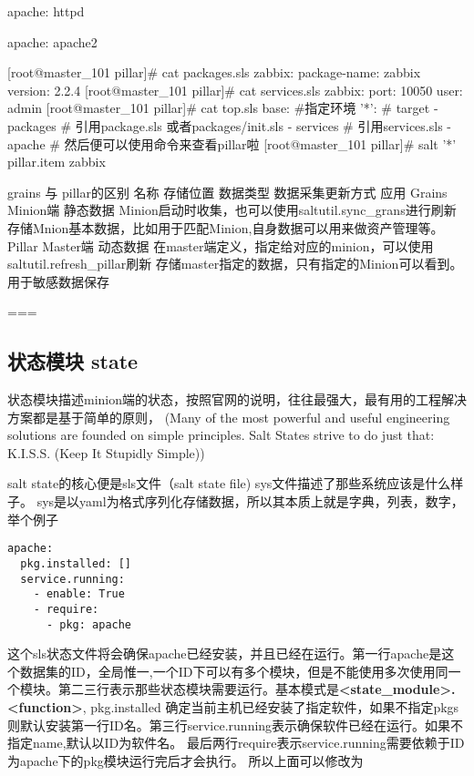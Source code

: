 {%
apache: httpd
{%
apache: apache2
{%

[root@master_101 pillar]# cat packages.sls
zabbix:
package-name: zabbix
version: 2.2.4
[root@master_101 pillar]# cat services.sls
zabbix:
port: 10050
user: admin
[root@master_101 pillar]# cat top.sls
base: #指定环境
'*': # target
- packages # 引用package.sls 或者packages/init.sls
- services # 引用services.sls
- apache
# 然后便可以使用命令来查看pillar啦
[root@master_101 pillar]# salt '*' pillar.item zabbix



grains 与 pillar的区别
名称	存储位置	数据类型	数据采集更新方式	应用
Grains	Minion端	静态数据	Minion启动时收集，也可以使用saltutil.sync_grans进行刷新	存储Mnion基本数据，比如用于匹配Minion,自身数据可以用来做资产管理等。
Pillar	Master端	动态数据	在master端定义，指定给对应的minion，可以使用saltutil.refresh_pillar刷新	存储master指定的数据，只有指定的Minion可以看到。用于敏感数据保存

===



\subsection{状态模块 state}

状态模块描述minion端的状态，按照官网的说明，往往最强大，最有用的工程解决方案都是基于简单的原则，
(Many of the most powerful and useful engineering solutions are founded on simple principles. Salt States strive to do just that: K.I.S.S. (Keep It Stupidly Simple))

salt state的核心便是sls文件（salt state file) sys文件描述了那些系统应该是什么样子。 sys是以yaml为格式序列化存储数据，所以其本质上就是字典，列表，数字，举个例子

\begin{lstlisting}
apache:
  pkg.installed: []
  service.running:
    - enable: True
    - require:
      - pkg: apache
\end{lstlisting}

这个sls状态文件将会确保apache已经安装，并且已经在运行。第一行apache是这个数据集的ID，全局惟一,一个ID下可以有多个模块，但是不能使用多次使用同一个模块。第二三行表示那些状态模块需要运行。基本模式是\textbf{<state_module>.<function>}, pkg.installed 确定当前主机已经安装了指定软件，如果不指定pkgs则默认安装第一行ID名。第三行service.running表示确保软件已经在运行。如果不指定name,默认以ID为软件名。
最后两行require表示service.running需要依赖于ID为apache下的pkg模块运行完后才会执行。 所以上面可以修改为

}}}
